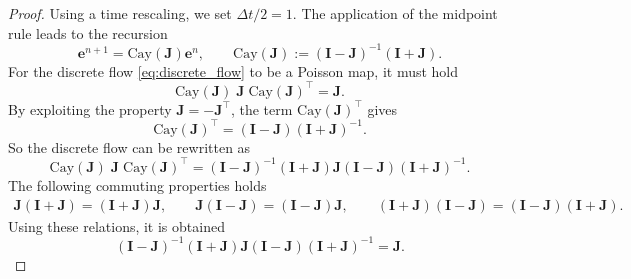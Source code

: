 \documentclass[10pt,a4paper]{amsart}
\begin{document}
\begin{proof}
    Using a time rescaling, we set $\Delta t/2 = 1$. 
    The application of the midpoint rule leads to the recursion 
    \begin{equation}\label{eq:discrete_flow}
        {\mathbf{e}}^{n+1} = \mathrm{Cay}({\mathbf{J}}) {\mathbf{e}}^{n}, \qquad  \mathrm{Cay}({\mathbf{J}}) := (\mathbf{I} -{\mathbf{J}})^{-1}(\mathbf{I} + {\mathbf{J}}).
    \end{equation}
    For the discrete flow \eqref{eq:discrete_flow} to be a Poisson map, it must hold
    $$
    \mathrm{Cay}({\mathbf{J}}) \; \mathbf{J} \; \mathrm{Cay}({\mathbf{J}})^\top = \mathbf{J}.
    $$
    By exploiting the property $\mathbf{J} = -\mathbf{J}^\top$, the term $\mathrm{Cay}({\mathbf{J}})^\top$ gives
    $$
    \mathrm{Cay}({\mathbf{J}})^\top = (\mathbf{I} -{\mathbf{J}})(\mathbf{I} + {\mathbf{J}})^{-1}.
    $$
    So the discrete flow can be rewritten as
    $$
    \mathrm{Cay}({\mathbf{J}}) \; \mathbf{J} \; \mathrm{Cay}({\mathbf{J}})^\top =  (\mathbf{I} -{\mathbf{J}})^{-1}(\mathbf{I} + {\mathbf{J}}) \mathbf{J} (\mathbf{I} -{\mathbf{J}})(\mathbf{I} + {\mathbf{J}})^{-1}.
    $$
    The following commuting properties holds
    \begin{equation}\label{eq:commutation_matrices}
        \begin{aligned}
            \mathbf{J}(\mathbf{I} + \mathbf{J}) = (\mathbf{I} + \mathbf{J}) \mathbf{J}, \qquad
            \mathbf{J}(\mathbf{I} - \mathbf{J}) = (\mathbf{I} - \mathbf{J}) \mathbf{J}, \qquad
            (\mathbf{I} + \mathbf{J})(\mathbf{I} - \mathbf{J}) = (\mathbf{I} - \mathbf{J})(\mathbf{I} + \mathbf{J}).            
        \end{aligned}
    \end{equation}
    Using these relations, it is obtained
    $$
    (\mathbf{I} -{\mathbf{J}})^{-1}(\mathbf{I} + {\mathbf{J}}) \mathbf{J} (\mathbf{I} -{\mathbf{J}})(\mathbf{I} + {\mathbf{J}})^{-1} = \mathbf{J}.
    $$
\end{proof}
\end{document}
